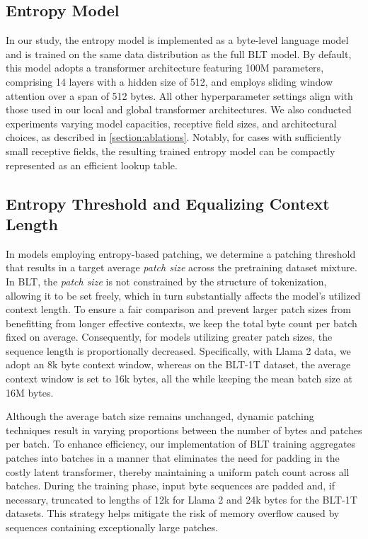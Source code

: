 \subsection{Entropy Model} In our study, the entropy model is implemented as a byte-level language model and is trained on the same data distribution as the full {\textsc BLT} model. By default, this model adopts a transformer architecture featuring 100M parameters, comprising 14 layers with a hidden size of 512, and employs sliding window attention over a span of 512 bytes. All other hyperparameter settings align with those used in our local and global transformer architectures. We also conducted experiments varying model capacities, receptive field sizes, and architectural choices, as described in \autoref{section:ablations}. Notably, for cases with sufficiently small receptive fields, the resulting trained entropy model can be compactly represented as an efficient lookup table.

\subsection{Entropy Threshold and Equalizing Context Length} In models employing entropy-based patching, we determine a patching threshold that results in a target average \textit{patch size} across the pretraining dataset mixture. In {\textsc BLT}, the \textit{patch size} is not constrained by the structure of tokenization, allowing it to be set freely, which in turn substantially affects the model’s utilized context length. To ensure a fair comparison and prevent larger patch sizes from benefitting from longer effective contexts, we keep the total byte count per batch fixed on average. Consequently, for models utilizing greater patch sizes, the sequence length is proportionally decreased. Specifically, with Llama 2 data, we adopt an 8k byte context window, whereas on the {\textsc BLT}-1T dataset, the average context window is set to 16k bytes, all the while keeping the mean batch size at 16M bytes.

Although the average batch size remains unchanged, dynamic patching techniques result in varying proportions between the number of bytes and patches per batch. To enhance efficiency, our implementation of {\textsc BLT} training aggregates patches into batches in a manner that eliminates the need for padding in the costly latent transformer, thereby maintaining a uniform patch count across all batches. During the training phase, input byte sequences are padded and, if necessary, truncated to lengths of 12k for Llama 2 and 24k bytes for the {\textsc BLT}-1T datasets. This strategy helps mitigate the risk of memory overflow caused by sequences containing exceptionally large patches.


